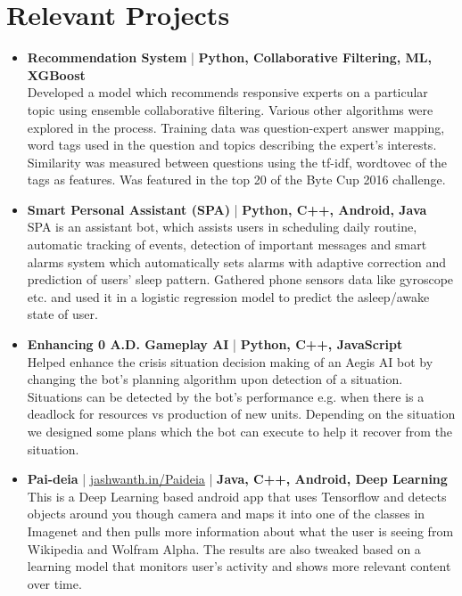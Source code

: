 \section{Relevant Projects}
\begin{itemize}
\item \textbf{Recommendation System} | \textbf{Python, Collaborative Filtering, ML, XGBoost}\\
 Developed a model which recommends responsive experts on a particular topic using ensemble collaborative filtering. Various other algorithms were explored in the process. Training data was question-expert answer mapping, word tags used in the question and topics describing the expert’s interests. Similarity was measured between questions using the tf-idf, wordtovec of the tags as features. Was featured in the top 20 of the Byte Cup 2016  challenge.

\item \textbf{Smart Personal Assistant (SPA)} | \textbf{Python, C++, Android, Java}\\
 SPA is an assistant bot, which assists users in scheduling daily routine, automatic tracking of events, detection of important messages and smart alarms system which automatically sets alarms with adaptive correction and prediction of users’ sleep pattern. Gathered phone sensors data like gyroscope etc. and used it in a logistic regression model to predict the asleep/awake state of user.

\item \textbf{Enhancing 0 A.D. Gameplay AI} | \textbf{Python, C++, JavaScript}\\
 Helped enhance the crisis situation decision making of an Aegis AI bot by changing the bot’s planning algorithm upon detection of a situation. Situations can be detected by the bot’s performance e.g. when there is a deadlock for resources vs production of new units. Depending on the situation we designed some plans which the bot can execute to help it recover from the situation.

 \item \textbf{Pai-deia} | \href{http://alseambusher.github.io/Paideia}{jashwanth.in/Paideia} | \textbf{Java, C++, Android, Deep Learning}\\
 This is a Deep Learning based android app that uses Tensorflow and detects objects around you though camera and maps it into one of the classes in Imagenet and then pulls more information about what the user is seeing from Wikipedia and Wolfram Alpha. The results are also tweaked based on a learning model that monitors user's activity and shows more relevant content over time.


\end{itemize}
